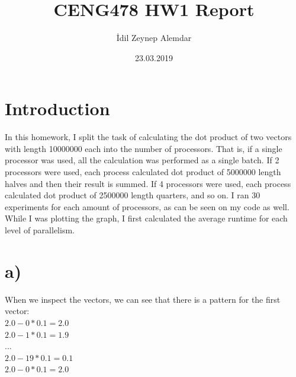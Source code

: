 \documentclass[12pt]{article}
\title{CENG478 HW1 Report}
\author{İdil Zeynep Alemdar}
\date{23.03.2019}
\begin{document}
	\begin{titlepage}
		\maketitle
	\end{titlepage}
\section*{Introduction}
In this homework, I split the task of calculating the dot product of two vectors with length 10000000 each into the number of processors. That is, if a single processor was used, all the calculation was performed as a single batch. If 2 processors were used, each process calculated dot product of 5000000 length halves and then their result is summed. If 4 processors were used, each process calculated dot product of 2500000 length quarters, and so on. I ran 30 experiments for each amount of processors, as can be seen on my code as well. While I was plotting the graph, I first calculated the average runtime for each level of parallelism.
\section*{a)}
When we inspect the vectors, we can see that there is a pattern for the first vector: \\
$2.0 - 0*0.1 = 2.0$\\
$2.0 - 1*0.1 = 1.9$\\
... \\
$2.0 - 19*0.1 = 0.1$\\
$2.0 - 0*0.1 = 2.0$\\
\end{document}
